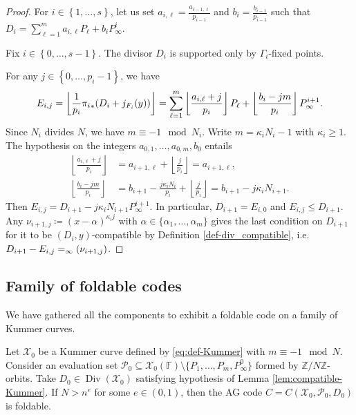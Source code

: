 \documentclass[10pt,a4paper]{article}
\newcommand\F{\mathbb{F}}
\newcommand\Z{\mathbb{Z}}
\newcommand\floor[1]{\left\lfloor #1 \right\rfloor}
\newcommand\poles[1]{\div_\infty\left( #1 \right)}
\DeclareMathOperator{\Div}{Div}
\let\div\relax\DeclareMathOperator{\div}{div}
\newcommand{\set}[1]{\left\{#1\right\}}
\newcommand{\range}[1]{\set{0,\dots,#1-1}}
\newcommand{\Range}[2]{\set{#1,\dots,#2}}
\newcommand\calX{\mathcal{X}}
\newcommand\calP{\mathcal{P}}
\newcommand\mydef{\coloneqq}
\theoremstyle{plain}
\theoremstyle{plain}
\theoremstyle{definition}
\theoremstyle{remark}
\theoremstyle{plain}
\begin{document}
\begin{proof}
	For $i \in \Range{1}{s}$, let us set $a_{i,\ell}=\frac{a_{i-1,\ell}}{p_{i-1}}$ and $b_i=\frac{b_{i-1}}{p_{i-1}}$ such that  $D_i=\sum_{\ell=1}^m a_{i,\ell} P_\ell + b_i P^i_\infty$.
	
	Fix $i \in \range{s}$. The divisor $D_i$ is supported only by $\Gamma_i$-fixed points.
	
	For any ${j \in \range{p_i}}$, we have
	\[E_{i,j} = \floor{\frac{1}{p_i} {\pi_i}_* (D_i+j\div_{F_i}(y))}=\sum_{\ell=1}^m \floor{\frac{a_{i,\ell} + j}{p_i}} P_\ell + \floor{\frac{b_i-jm}{p_i}}P^{i+1}_\infty.\]
	Since $N_i$ divides $N$, we have $m \equiv -1 \mod N_i$. Write $m=\kappa_i N_i -1$ with $\kappa_i \geq 1$. 
	The hypothesis on the integers  $a_{0,1},\dots,a_{0,m},b_{0}$ entails
	\[\begin{aligned}
		\floor{\frac{a_{i,\ell} + j}{p_i}}&=a_{i+1,\ell} + \floor{\frac{j}{p_i}}= a_{i+1,\ell} , \\
		\floor{\frac{b_i-jm}{p_i}}&=b_{i+1}-\frac{j\kappa_i N_i}{p_i} + \floor{\frac{j}{p_i}} = b_{i+1}-j\kappa_i N_{i+1} .
	\end{aligned}\]
	Then $E_{i,j}= D_{i+1} - j \kappa_i N_{i+1}P^{i+1}_\infty$. In particular, $D_{i+1}=E_{i,0}$ and $E_{i,j} \leq D_{i+1}$. Any ${\nu_{i+1,j}\mydef(x-\alpha)^{\kappa_i j}}$ with ${\alpha \in \{\alpha_1,\dots,\alpha_m\}}$ gives the last condition on $D_{i+1}$ for it to be $(D_i,y)$-compatible by Definition \ref{def-div_compatible}, i.e. ${D_{i+1}-E_{i,j}= \poles{\nu_{i+1,j}}}$.
\end{proof}

\subsection{Family of foldable codes}

We have gathered all the components to exhibit a foldable code on a family of Kummer curves.

\begin{proposition}\label{prop:Kummer_foldable}
	Let $\calX_0$ be a Kummer curve defined by \eqref{eq:def-Kummer} with $m \equiv -1 \mod N$. Consider an evaluation set $\calP_0\subseteq \calX_0(\F) \setminus \{P_1,\dots, P_m,P^0_\infty\}$ formed by $\Z/N\Z$-orbits.
	Take $D_0\in \Div(\calX_0)$ satisfying hypothesis of Lemma \ref{lem:compatible-Kummer}. If $N>n^e$ for some $e \in (0,1)$, then the AG code $C=C(\calX_0,\calP_0,D_0)$ is foldable.
\end{proposition}
\end{document}
